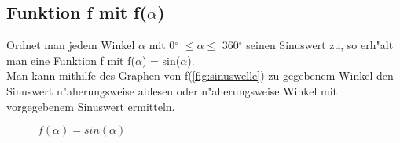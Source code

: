 \documentclass{standalone}
\begin{document}
\subsection{Funktion f mit f($\alpha$)}

Ordnet man jedem Winkel $\alpha$ mit 0$^\circ$  $\leq \alpha \leq$ 360$^\circ$  seinen Sinuswert zu, so erh{"a}lt man eine Funktion f mit f($\alpha$) = sin($\alpha$).\\
Man kann mithilfe des Graphen von f(\autoref{fig:sinuswelle}) zu gegebenem Winkel den Sinuswert n{"a}herungsweise ablesen oder n{"a}herungsweise Winkel mit vorgegebenem Sinuswert ermitteln.

\begin{figure}[hb!]
  \center
  \def\svgwidth{500px}
  
  \caption{$f(\alpha) = sin(\alpha)$}
  \label{fig:sinuswelle}
\end{figure}
\end{document}
